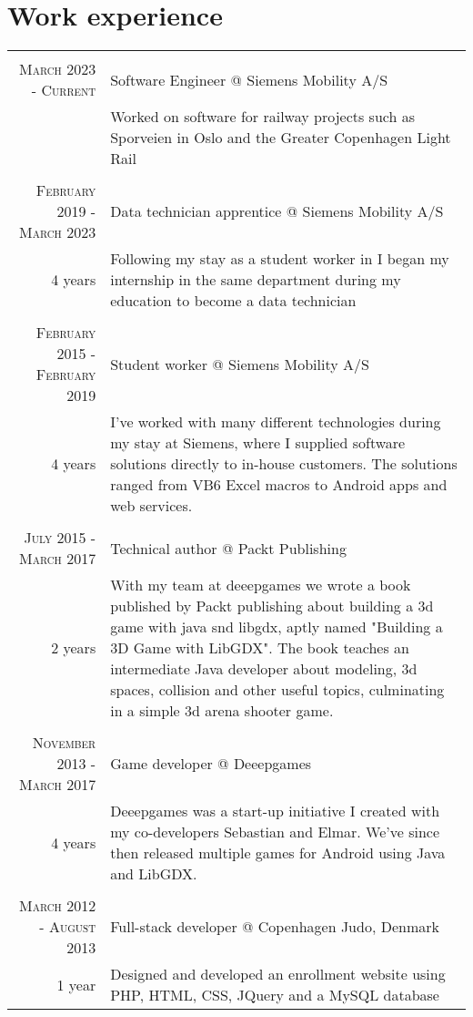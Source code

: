 \documentclass[a4paper,10pt]{article}
\begin{document}
\section{Work experience}
\begin{tabular}{r|p{11cm}}
    \multicolumn{2}{c}{} \\
    \textsc{March 2023 - Current} & Software Engineer @ Siemens Mobility A/S \\ &\footnotesize{Worked on software for railway projects such as Sporveien in Oslo and the Greater Copenhagen Light Rail}\\

    \multicolumn{2}{c}{} \\
    \textsc{February 2019 - March 2023} & Data technician apprentice @ Siemens Mobility A/S\\ \footnotesize{4 years} &\footnotesize{Following my stay as a student worker in I began my internship in the same department during my education to become a data technician}\\
    
    \multicolumn{2}{c}{} \\
    \textsc{February 2015 - February 2019} & Student worker @ Siemens Mobility A/S\\ \footnotesize{4 years}&\footnotesize{I’ve worked with many different technologies during my stay at Siemens, where I supplied software solutions directly to in-house customers. The solutions ranged from VB6 Excel macros to Android apps and web services.}\\
    
    \multicolumn{2}{c}{} \\
    \textsc{July 2015 - March 2017} & Technical author @ Packt Publishing\\ \footnotesize{2 years}&\footnotesize{With my team at deeepgames we wrote a book published by Packt publishing about building a 3d game with java snd libgdx, aptly named "Building a 3D Game with LibGDX". The book teaches an intermediate Java developer about modeling, 3d spaces, collision and other useful topics, culminating in a simple 3d arena shooter game.}\\

    \multicolumn{2}{c}{} \\
    \textsc{November 2013 - March 2017} & Game developer @ Deeepgames\\ \footnotesize{4 years}&\footnotesize{Deeepgames was a start-up initiative I created with my co-developers Sebastian and Elmar. We've since then released multiple games for Android using Java and LibGDX.}\\

    \multicolumn{2}{c}{} \\
    \textsc{March 2012 - August 2013} & Full-stack developer @ Copenhagen Judo, Denmark \\ \footnotesize{1 year}&\footnotesize{Designed and developed an enrollment website using PHP, HTML, CSS, JQuery and a MySQL database}\\
    
\end{tabular}
\end{document}
